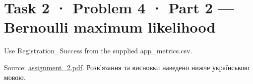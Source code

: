 \documentclass[11pt]{article}
\title{}
\begin{document}
    
    \maketitle
    
    

    
    \section{Task 2 · Problem 4 · Part 2 --- Bernoulli maximum
likelihood}\label{task-2-problem-4-part-2-bernoulli-maximum-likelihood}

Use Registration\_Success from the supplied app\_metrics.csv.

Source: \href{../../../input/assignment_2.pdf}{assignment\_2.pdf}. Розв'язання
та висновки наведено нижче українською мовою.
\end{document}
